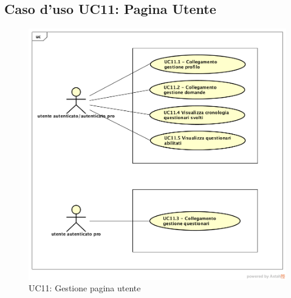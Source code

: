 \newpage
\subsection{Caso d'uso UC11: Pagina Utente}
\label{UC11}
\begin{figure}[h]
	\centering
	\includegraphics[scale=0.5]{UML/UC11.png}
	\caption{UC11: Gestione pagina utente}
\end{figure}

